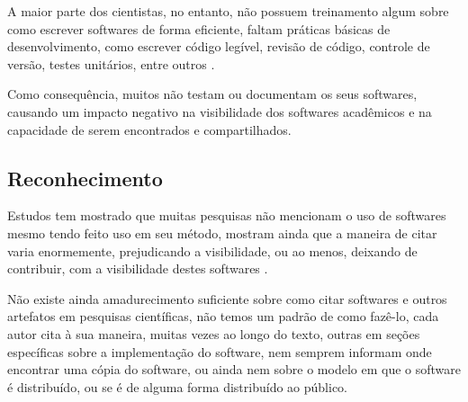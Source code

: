 A maior parte dos cientistas, no entanto, não possuem treinamento algum sobre
como escrever softwares de forma eficiente, faltam práticas básicas de
desenvolvimento, como escrever código legível, revisão de código, controle de
versão, testes unitários, entre outros \cite{wilson2017good}.

%

Como consequência, muitos não testam ou documentam os seus softwares, causando
um impacto negativo na visibilidade dos softwares acadêmicos \cite{howison2013,
katz2014transitive} e na capacidade de serem encontrados e compartilhados.


\subsection{Reconhecimento}


Estudos tem mostrado que muitas pesquisas não mencionam o uso de softwares
mesmo tendo feito uso em seu método, mostram ainda que a maneira de citar
varia enormemente, prejudicando a visibilidade, ou ao menos, deixando de
contribuir, com a visibilidade destes softwares \cite{howison2016software}.

Não existe ainda amadurecimento suficiente sobre como citar softwares e
outros artefatos em pesquisas científicas, não temos um padrão de como fazê-lo,
cada autor cita à sua maneira, muitas vezes ao longo do texto, outras em seções
específicas sobre a implementação do software, nem semprem informam onde
encontrar uma cópia do software, ou ainda nem sobre o modelo em que o software
é distribuído, ou se é de alguma forma distribuído ao público.


